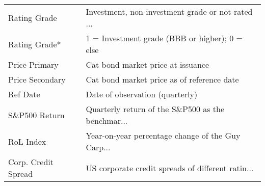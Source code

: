 \begin{tabular}{ll}
Rating Grade        &  Investment, non-investment grade or not-rated ... \\
Rating Grade*       &     1 = Investment grade (BBB or higher); 0 = else \\
Price Primary       &                  Cat bond market price at issuance \\
Price Secondary     &         Cat bond market price as of reference date \\
Ref Date            &                    Date of observation (quarterly) \\
S\&P500 Return       &  Quarterly return of the S\&P500 as the benchmar... \\
RoL Index           &  Year-on-year percentage change of the Guy Carp... \\
Corp. Credit Spread &  US corporate credit spreads of different ratin... \\
\bottomrule
\end{tabular}
